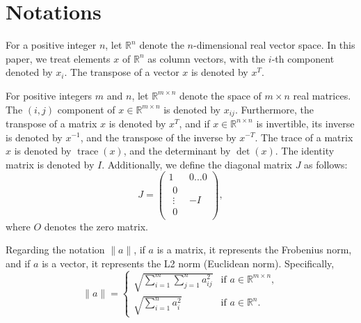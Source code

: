 \section{Notations}\label{sec:notation}


For a positive integer $n$, let $\mathbb{R}^n$ denote the $n$-dimensional real vector space.
In this paper, we treat elements $x$ of $\mathbb{R}^n$ as column vectors, with the $i$-th component denoted by $x_i$.
The transpose of a vector $x$ is denoted by $x^T$.

For positive integers $m$ and $n$, let $\mathbb{R}^{m \times n}$ denote the space of $m \times n$ real matrices.
The $(i,j)$ component of $x \in \mathbb{R}^{m \times n}$ is denoted by $x_{ij}$.
Furthermore, the transpose of a matrix $x$ is denoted by $x^T$, and if $x \in \mathbb{R}^{n \times n}$ is invertible, its inverse is denoted by $x^{-1}$, and the transpose of the inverse by $x^{-T}$.
The trace of a matrix $x$ is denoted by $\operatorname{trace}(x)$, and the determinant by $\operatorname{det}(x)$.
The identity matrix is denoted by $I$.
Additionally, we define the diagonal matrix $J$ as follows:
\[
    J = \begin{pmatrix}
         1 & 0 \ldots 0\\
         \substack{\displaystyle 0\\\displaystyle\vdots\\\displaystyle 0} & -I 
    \end{pmatrix},
\]
where $O$ denotes the zero matrix.

Regarding the notation $\|a\|$, if $a$ is a matrix, it represents the Frobenius norm, and if $a$ is a vector, it represents the L2 norm (Euclidean norm).
Specifically,
\[
\|a\| = 
\begin{cases}
    \sqrt{\sum_{i=1}^m \sum_{j=1}^n a_{ij}^2} & \text{if } a \in \mathbb{R}^{m \times n},\\
    \sqrt{\sum_{i=1}^n a_i^2} & \text{if } a \in \mathbb{R}^n.
\end{cases}
\]

